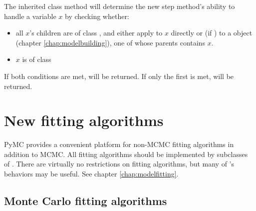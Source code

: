 The inherited class method  will determine the new step method's ability to handle a variable $x$ by checking whether:
\begin{itemize}
   \item all $x$'s children are of class , and either apply  to $x$ directly or (if ) to a  object (chapter \ref{chap:modelbuilding}), one of whose parents contains $x$.
   \item $x$ is of class 
\end{itemize}
If both conditions are met,  will be returned. If only the first is met,  will be returned.


\section{New fitting algorithms} \label{custom-model}


PyMC provides a convenient platform for non-MCMC fitting algorithms in addition to MCMC. All fitting algorithms should be implemented by subclasses of . There are virtually no restrictions on fitting algorithms, but many of 's behaviors may be useful. See chapter \ref{chap:modelfitting}.


\subsection{Monte Carlo fitting algorithms} \label{custom-MC}


